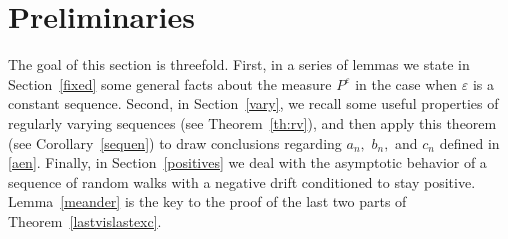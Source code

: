 \documentclass[12pt]{amsart}
\begin{document}
\section{Preliminaries}
\label{sec:prel} The goal of this section is threefold. First, in
a series of lemmas we state in Section~\ref{fixed} some general facts about
the measure $P^{\varepsilon}$  in the case when ${\varepsilon}$ is a constant sequence.
Second, in Section~\ref{vary}, we recall some useful properties of regularly varying
sequences (see Theorem~\ref{th:rv}), and then apply this theorem (see Corollary~\ref{sequen}) to draw conclusions regarding
$a_n,$ $b_n,$ and $c_n$ defined in \eqref{aen}. Finally,
in Section~\ref{positives} we deal with the asymptotic behavior
of a sequence of random walks with a negative drift conditioned to stay positive.
Lemma~\ref{meander} is the key to the proof of the last two parts of Theorem~\ref{lastvislastexc}.
\end{document}
